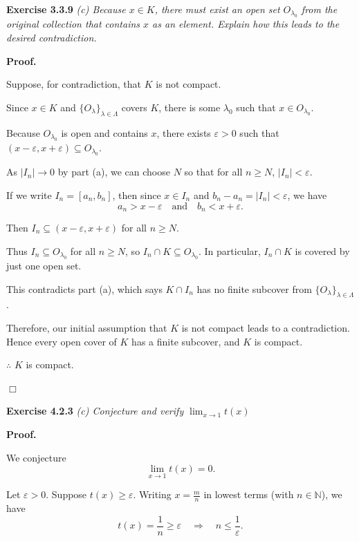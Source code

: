 \documentclass[reqno,11pt]{amsart}
\begin{document}
\noindent\textbf{Exercise 3.3.9}  
\textit{(c) Because \( x \in K \), there must exist an open set \( O_{\lambda_0} \) from the original collection that contains \( x \) as an element. Explain how this leads to the desired contradiction.}
\medskip

\noindent\textbf{Proof.}

Suppose, for contradiction, that \(K\) is not compact.

Since \(x \in K\) and \(\{O_\lambda\}_{\lambda \in \Lambda}\) covers \(K\), there is some \(\lambda_0\) such that \(x \in O_{\lambda_0}\).

Because \(O_{\lambda_0}\) is open and contains \(x\), there exists \(\varepsilon > 0\) such that \((x - \varepsilon, x + \varepsilon) \subseteq O_{\lambda_0}\).

As \(|I_n| \to 0\) by part (a), we can choose \(N\) so that for all \(n \ge N\), \(|I_n| < \varepsilon\).

If we write \(I_n = [a_n, b_n]\), then since \(x \in I_n\) and \(b_n - a_n = |I_n| < \varepsilon\), we have
\[
a_n > x - \varepsilon \quad \text{and} \quad b_n < x + \varepsilon.
\]

Then \(I_n \subseteq (x - \varepsilon, x + \varepsilon)\) for all \(n \ge N\).

Thus \(I_n \subseteq O_{\lambda_0}\) for all \(n \ge N\), so \(I_n \cap K \subseteq O_{\lambda_0}\). In particular, \(I_n \cap K\) is covered by just one open set.

This contradicts part (a), which says \(K \cap I_n\) has no finite subcover from \(\{O_\lambda\}_{\lambda \in \Lambda}\).

Therefore, our initial assumption that \(K\) is not compact leads to a contradiction. Hence every open cover of \(K\) has a finite subcover, and \(K\) is compact.

$\therefore$ \(K\) is compact.

\hfill$\Box$

\newpage

\noindent\textbf{Exercise 4.2.3}  
\textit{(c) Conjecture and verify $\lim_{x \to 1} t(x)$}
\medskip

\noindent\textbf{Proof.}

We conjecture
\[
\lim_{x \to 1} t(x) = 0.
\]

Let \(\varepsilon > 0\). Suppose \(t(x) \geq \varepsilon\). Writing \(x = \frac{m}{n}\) in lowest terms (with \(n \in \mathbb{N}\)), we have
\[
t(x) = \frac{1}{n} \geq \varepsilon \quad \Rightarrow \quad n \leq \frac{1}{\varepsilon}.
\]
\end{document}
